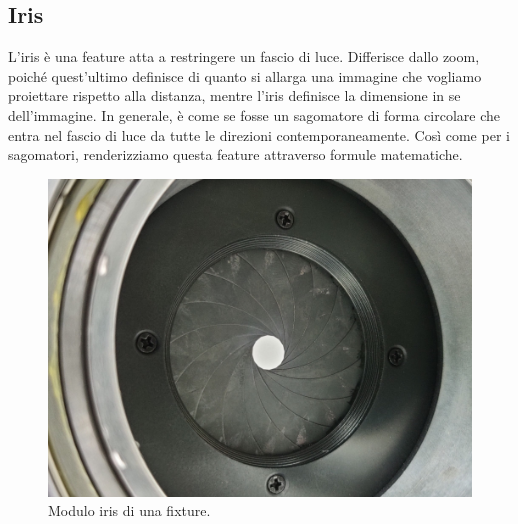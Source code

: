 \documentclass[main.tex]{subfiles}
\begin{document}
\clearpage
\subsection{Iris}\label{subsec:5_Iris}
L'iris è una feature atta a restringere un fascio di luce. Differisce dallo zoom, poiché quest'ultimo definisce di quanto si allarga una immagine che vogliamo proiettare rispetto alla distanza, mentre l'iris definisce la dimensione in se dell'immagine. In generale, è come se fosse un sagomatore di forma circolare che entra nel fascio di luce da tutte le direzioni contemporaneamente. Così come per i sagomatori, renderizziamo questa feature attraverso formule matematiche.
\begin{figure}[H]
    \centering
    \includegraphics[width=.75\linewidth]{img/newFeatures/Iris.jpg}
    \caption{Modulo iris di una fixture.}
    \label{fig:5_iris}
\end{figure}
\end{document}
